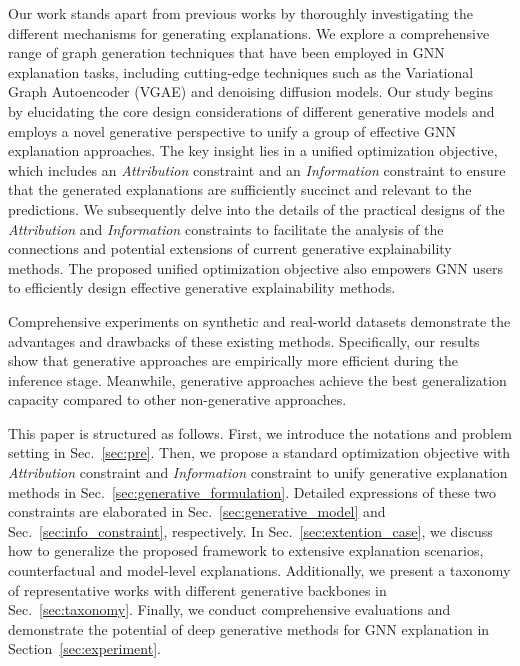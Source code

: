 
Our work stands apart from previous works by thoroughly investigating the different mechanisms for generating explanations. We explore a comprehensive range of graph generation techniques that have been employed in GNN explanation tasks, including cutting-edge techniques such as the Variational Graph Autoencoder (VGAE) and denoising diffusion models. Our study begins by elucidating the core design considerations of different generative models and employs a novel generative perspective to unify a group of effective GNN explanation approaches. The key insight lies in a unified optimization objective, which includes an \textit{Attribution} constraint and an \textit{Information} constraint to ensure that the generated explanations are sufficiently succinct and relevant to the predictions. We subsequently delve into the details of the practical designs of the \textit{Attribution} and \textit{Information} constraints to facilitate the analysis of the connections and potential extensions of current generative explainability methods. The proposed unified optimization objective also empowers GNN users to efficiently design effective generative explainability methods.

Comprehensive experiments on synthetic and real-world datasets demonstrate the advantages and drawbacks of these existing methods. Specifically, our results show that generative approaches are empirically more efficient during the inference stage. Meanwhile, generative approaches achieve the best generalization capacity compared to other non-generative approaches.

This paper is structured as follows. First, we introduce the notations and problem setting in Sec.~\ref{sec:pre}. Then, we propose a standard optimization objective with \textit{Attribution} constraint and \textit{Information} constraint to unify generative explanation methods in Sec.~\ref{sec:generative_formulation}. Detailed expressions of these two constraints are elaborated in Sec.~\ref{sec:generative_model} and Sec.~\ref{sec:info_constraint}, respectively. In Sec.~\ref{sec:extention_case}, we discuss how to generalize the proposed framework to extensive explanation scenarios, \eg counterfactual and model-level explanations. Additionally, we present a taxonomy of representative works with different generative backbones in Sec.~\ref{sec:taxonomy}. Finally, we conduct comprehensive evaluations and demonstrate the potential of deep generative methods for GNN explanation in Section~\ref{sec:experiment}.

